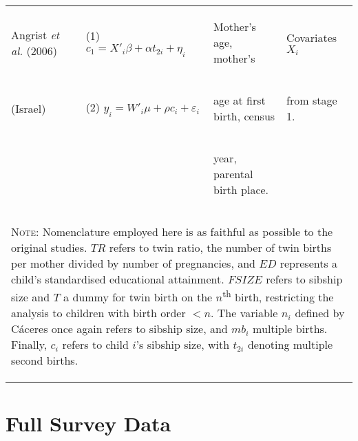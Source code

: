 \documentclass{article}[11pt,subeqn]
\begin{document}
\begin{spacing}{1.5}
\begin{center}
\begin{rotate}{90}
\begin{tabular}{lp{4mm}lll}
Angrist \emph{et al.} (2006) &  &
(1)  $c_1=X'_i\beta+\alpha t_{2i}+\eta_i$ &
\begin{small}Mother's age, mother's \end{small} & 
\begin{small}Covariates $X_i$\end{small}
\\
(Israel) & &
(2) $y_i=W'_i\mu+\rho c_i + \varepsilon_i$ &  
\begin{small}age at first birth, census \end{small} &
\begin{small}from stage 1.\end{small}
\\
& & &
\begin{small}year, parental birth place.\end{small}&
\\
\bottomrule 
\multicolumn{5}{p{19.2cm}}{\setstretch{0.9}\begin{footnotesize}\textsc{Note:} Nomenclature employed here is as faithful as possible to the original studies.  $TR$ refers to twin ratio, the number of twin births per mother divided by number of pregnancies, and $ED$ represents a child's standardised educational attainment. $FSIZE$ refers to sibship size and $T$ a dummy for twin birth on the $n$\textsuperscript{th} birth, restricting the analysis to children with birth order $<n$. The variable $n_i$ defined by C\'aceres once again refers to sibship size, and $mb_i$ multiple births. Finally, $c_i$ refers to child $i$'s sibship size, with $t_{2i}$ denoting multiple second births.\end{footnotesize}}\\
\end{tabular}
\end{rotate}
\label{tab:litrev}
\end{center}

\section{Full Survey Data}
\label{scn:surveys}



\end{spacing}
\end{document}
